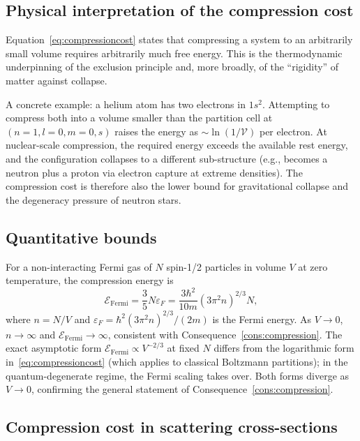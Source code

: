 \subsection{Physical interpretation of the compression cost}

Equation~\eqref{eq:compressioncost} states that compressing a system to an arbitrarily small volume requires arbitrarily much free energy. This is the thermodynamic underpinning of the exclusion principle and, more broadly, of the ``rigidity'' of matter against collapse.

A concrete example: a helium atom has two electrons in $1s^{2}$. Attempting to compress both into a volume smaller than the partition cell at $(n=1,l=0,m=0,s)$ raises the energy as $\sim\ln(1/\mathcal{V})$ per electron. At nuclear-scale compression, the required energy exceeds the available rest energy, and the configuration collapses to a different sub-structure (e.g., becomes a neutron plus a proton via electron capture at extreme densities). The compression cost is therefore also the lower bound for gravitational collapse and the degeneracy pressure of neutron stars.

\subsection{Quantitative bounds}

For a non-interacting Fermi gas of $N$ spin-1/2 particles in volume $V$ at zero temperature, the compression energy is
\begin{equation*}
\mathcal{E}_{\text{Fermi}}=\frac{3}{5}N\varepsilon_{F}=\frac{3\hbar^{2}}{10m}(3\pi^{2}n)^{2/3}N,
\end{equation*}
where $n=N/V$ and $\varepsilon_{F}=\hbar^{2}(3\pi^{2}n)^{2/3}/(2m)$ is the Fermi energy. As $V\to 0$, $n\to\infty$ and $\mathcal{E}_{\text{Fermi}}\to\infty$, consistent with Consequence~\ref{cons:compression}. The exact asymptotic form $\mathcal{E}_{\text{Fermi}}\propto V^{-2/3}$ at fixed $N$ differs from the logarithmic form in~\eqref{eq:compressioncost} (which applies to classical Boltzmann partitions); in the quantum-degenerate regime, the Fermi scaling takes over. Both forms diverge as $V\to 0$, confirming the general statement of Consequence~\ref{cons:compression}.

\subsection{Compression cost in scattering cross-sections}

